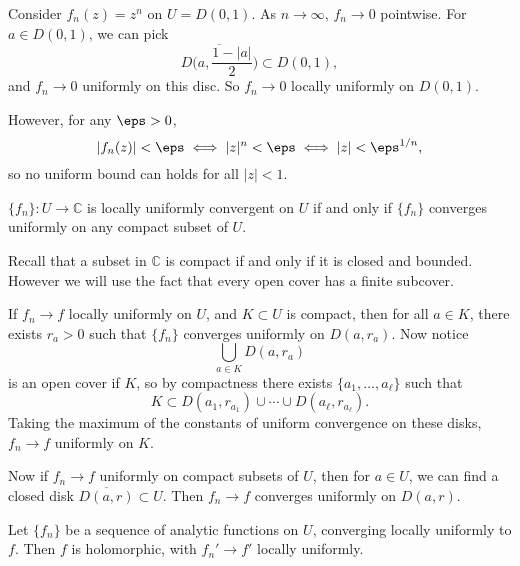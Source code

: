 \documentclass[12pt]{article}
\begin{document}
\begin{exbox}
	Consider $f_n(z) = z^{n}$ on $U = D(0, 1)$. As $n \to \infty$, $f_n \to 0$ pointwise. For $a \in D(0, 1)$, we can pick
	\[
	\overline{D\biggl(a, \frac{1-|a|}{2}\biggr)} \subset D(0,1),
	\]
	and $f_n \to 0$ uniformly on this disc. So $f_n \to 0$ locally uniformly on $D(0, 1)$.

	However, for any $\eps > 0$,
	\[
	|f_n(z)| < \eps \iff |z|^{n} < \eps \iff |z| < \eps^{1/n},
	\]
	so no uniform bound can holds for all $|z| < 1$.
\end{exbox}

\begin{proposition}
	$\{f_n\} : U \to \mathbb{C}$ is locally uniformly convergent on $U$ if and only if $\{f_n\}$ converges uniformly on any compact subset of $U$.
\end{proposition}

Recall that a subset in $\mathbb{C}$ is compact if and only if it is closed and bounded. However we will use the fact that every open cover has a finite subcover.

\begin{proofbox}
	If $f_n \to f$ locally uniformly on $U$, and $K \subset U$ is compact, then for all $a \in K$, there exists $r_a > 0$ such that $\{f_n\}$ converges uniformly on $D(a, r_a)$. Now notice
	\[
	\bigcup_{a \in K} D(a, r_a)
	\]
	is an open cover if $K$, so by compactness there exists $\{a_1, \ldots, a_\ell\}$ such that
	\[
	K \subset D(a_1, r_{a_1}) \cup \cdots \cup D(a_\ell, r_{a_\ell}).
	\]
	Taking the maximum of the constants of uniform convergence on these disks, $f_n \to f$ uniformly on $K$.

	Now if $f_n \to f$ uniformly on compact subsets of $U$, then for $a \in U$, we can find a closed disk $\overline{D(a, r)} \subset U$. Then $f_n \to f$ converges uniformly on $D(a, r)$.
\end{proofbox}

\begin{theorem}
	Let $\{f_n\}$ be a sequence of analytic functions on $U$, converging locally uniformly to $f$. Then $f$ is holomorphic, with $f_n' \to f'$ locally uniformly.
\end{theorem}
\end{document}
